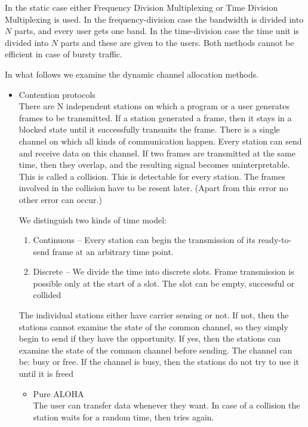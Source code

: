 \documentclass[margin=0px]{article}
\begin{document}
\begin{description}
\begin{description}
                In the static case either Frequency Division Multiplexing or Time Division Multiplexing is used. In the frequency-division case the bandwidth is divided into $N$ parts, and every user gets one band. In the time-division case the time unit is divided into $N$ parts and these are given to the users. Both methods cannot be efficient in case of bursty traffic.

                In what follows we examine the dynamic channel allocation methods.
                \begin{itemize}
                    \item Contention protocols \\
                          There are N independent stations on which a program or a user generates frames to be transmitted. If a station generated a frame, then it stays in a blocked state until it successfully transmits the frame. There is a single channel on which all kinds of communication happen. Every station can send and receive data on this channel. If two frames are transmitted at the same time, then they overlap, and the resulting signal becomes uninterpretable. This is called a collision. This is detectable for every station. The frames involved in the collision have to be resent later. (Apart from this error no other error can occur.)

                          We distinguish two kinds of time model:
                          \begin{enumerate}
                              \item Continuous -- Every station can begin the transmission of its ready-to-send frame at an arbitrary time point.
                              \item Discrete -- We divide the time into discrete slots. Frame transmission is possible only at the start of a slot. The slot can be empty, successful or collided
                          \end{enumerate}

                          The individual stations either have carrier sensing or not. If not, then the stations cannot examine the state of the common channel, so they simply begin to send if they have the opportunity. If yes, then the stations can examine the state of the common channel before sending. The channel can be: busy or free. If the channel is busy, then the stations do not try to use it until it is freed

                          \begin{itemize}
                              \item Pure ALOHA \\
                                    The user can transfer data whenever they want. In case of a collision the station waits for a random time, then tries again.


\end{itemize}
\end{itemize}
\end{description}
\end{description}
\end{document}

